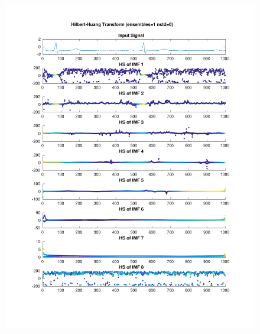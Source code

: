 \documentclass{beamer}
\begin{document}
\begin{frame}
\begin{columns}
\begin{figure}
\includegraphics[width=\textwidth]{fig/123l1_hht.pdf}
\end{figure}
\end{columns}
\end{frame}


\end{document}
